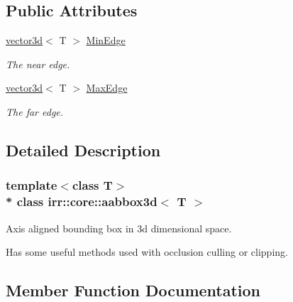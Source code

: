 \subsection*{Public Attributes}
\begin{DoxyCompactItemize}
\item 
\hyperlink{classirr_1_1core_1_1vector3d}{vector3d}$<$ T $>$ \hyperlink{classirr_1_1core_1_1aabbox3d_a7501c7df834939fa25e5f70b8527e7b5}{Min\+Edge}\hypertarget{classirr_1_1core_1_1aabbox3d_a7501c7df834939fa25e5f70b8527e7b5}{}\label{classirr_1_1core_1_1aabbox3d_a7501c7df834939fa25e5f70b8527e7b5}

\begin{DoxyCompactList}\small\item\em The near edge. \end{DoxyCompactList}\item 
\hyperlink{classirr_1_1core_1_1vector3d}{vector3d}$<$ T $>$ \hyperlink{classirr_1_1core_1_1aabbox3d_a5aad7217e8189f09dde3ec4a69e4ac92}{Max\+Edge}\hypertarget{classirr_1_1core_1_1aabbox3d_a5aad7217e8189f09dde3ec4a69e4ac92}{}\label{classirr_1_1core_1_1aabbox3d_a5aad7217e8189f09dde3ec4a69e4ac92}

\begin{DoxyCompactList}\small\item\em The far edge. \end{DoxyCompactList}\end{DoxyCompactItemize}


\subsection{Detailed Description}
\subsubsection*{template$<$class T$>$\\*
class irr\+::core\+::aabbox3d$<$ T $>$}

Axis aligned bounding box in 3d dimensional space. 

Has some useful methods used with occlusion culling or clipping. 

\subsection{Member Function Documentation}
